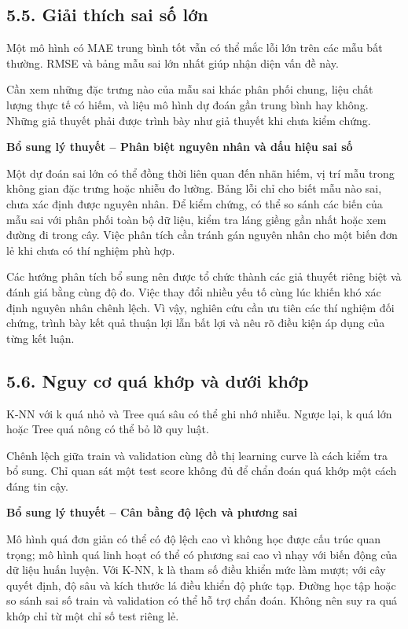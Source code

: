 \documentclass[12pt,a4paper,oneside]{article}
\begin{document}
\subsection*{5.5. Giải thích sai số lớn}

Một mô hình có MAE trung bình tốt vẫn có thể mắc lỗi lớn trên các mẫu
bất thường. RMSE và bảng mẫu sai lớn nhất giúp nhận diện vấn đề này.

Cần xem những đặc trưng nào của mẫu sai khác phân phối chung, liệu chất
lượng thực tế có hiếm, và liệu mô hình dự đoán gần trung bình hay không.
Những giả thuyết phải được trình bày như giả thuyết khi chưa kiểm chứng.


\par\noindent\textbf{Bổ sung lý thuyết -- Phân biệt nguyên nhân và dấu hiệu sai số}\par
Một dự đoán sai lớn có thể đồng thời liên quan đến nhãn hiếm, vị trí mẫu trong không gian đặc trưng hoặc nhiễu đo lường. Bảng lỗi chỉ cho biết mẫu nào sai, chưa xác định được nguyên nhân. Để kiểm chứng, có thể so sánh các biến của mẫu sai với phân phối toàn bộ dữ liệu, kiểm tra láng giềng gần nhất hoặc xem đường đi trong cây. Việc phân tích cần tránh gán nguyên nhân cho một biến đơn lẻ khi chưa có thí nghiệm phù hợp.\par

Các hướng phân tích bổ sung nên được tổ chức thành các giả thuyết riêng biệt và đánh giá bằng cùng độ đo. Việc thay đổi nhiều yếu tố cùng lúc khiến khó xác định nguyên nhân chênh lệch. Vì vậy, nghiên cứu cần ưu tiên các thí nghiệm đối chứng, trình bày kết quả thuận lợi lẫn bất lợi và nêu rõ điều kiện áp dụng của từng kết luận.\par

\subsection*{5.6. Nguy cơ quá khớp và dưới khớp}

K-NN với k quá nhỏ và Tree quá sâu có thể ghi nhớ nhiễu. Ngược lại, k
quá lớn hoặc Tree quá nông có thể bỏ lỡ quy luật.

Chênh lệch giữa train và validation cùng đồ thị learning curve là cách
kiểm tra bổ sung. Chỉ quan sát một test score không đủ để chẩn đoán quá
khớp một cách đáng tin cậy.


\par\noindent\textbf{Bổ sung lý thuyết -- Cân bằng độ lệch và phương sai}\par
Mô hình quá đơn giản có thể có độ lệch cao vì không học được cấu trúc quan trọng; mô hình quá linh hoạt có thể có phương sai cao vì nhạy với biến động của dữ liệu huấn luyện. Với K-NN, k là tham số điều khiển mức làm mượt; với cây quyết định, độ sâu và kích thước lá điều khiển độ phức tạp. Đường học tập hoặc so sánh sai số train và validation có thể hỗ trợ chẩn đoán. Không nên suy ra quá khớp chỉ từ một chỉ số test riêng lẻ.\par
\end{document}
